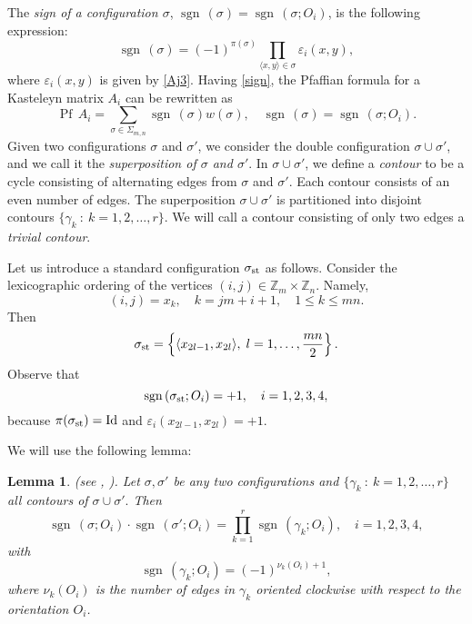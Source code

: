 \documentclass[12pt,reqno]{amsart}
\numberwithin{equation}{section}
\newcommand{\Z}{{\mathbb Z}}
\newcommand{\ga}{\gamma}
\newcommand{\ep}{\varepsilon}
\newcommand{\sg}{\sigma}
\newcommand{\Pf}{{\operatorname{Pf}\,}}
\newcommand{\sgn}{{\operatorname{sgn}\,}}
\newtheorem{lem}[theo]{{\sc \bf Lemma}}
\begin{document}
 The \textit{sign of a configuration $\sg$}, $\sgn(\sg)=\sgn(\sg;O_i)$, is the following expression:
\begin{equation}\label{sign}
\sgn(\sg)=(-1)^{\pi(\sg)}\prod_{\langle x,y\rangle \in\sg}\varepsilon_i(x,y),
\end{equation}
where $\varepsilon_i(x,y)$ is given by \eqref{Aj3}. Having \eqref{sign}, the Pfaffian formula for a Kasteleyn matrix $A_i$ can be rewritten as 
\begin{equation}\label{Pfsign}
\Pf A_i=\sum_{\sg\in\Sigma_{m,n}}\sgn(\sg)w(\sg),\quad  \sgn(\sg)=\sgn(\sg;O_i).
\end{equation}
Given two configurations $\sg$ and $\sg'$, we consider the double configuration $\sg\cup\sg'$, and we call it the \textit{superposition of $\sg$ and $\sg'$}. In $\sg\cup\sg'$, we define a \textit{contour} to be a cycle consisting of alternating edges from $\sg$ and $\sg'$. Each contour consists of an even number of edges. The superposition $\sg\cup\sg'$ is partitioned into disjoint contours $\{\ga_k\ :\ k=1,2,\ldots,r\}$. We will call a contour consisting of only two edges a \textit{trivial contour}. 

Let us introduce a standard configuration $\sg_{\rm st}$ as follows. Consider the lexicographic ordering of the
vertices $(i,j)\in \Z_m\times \Z_n$. Namely,
\begin{equation}\label{lex1}
(i,j)=x_k,\quad  k=jm+i+1, \quad 1\le k\le mn.
\end{equation}
Then
\begin{equation}\label{lex2}
\sg_{\rm st}=\left\{\langle x_{2l-1},x_{2l}\rangle,\; l=1,\ldots,\frac{mn}{2}\right\}.
\end{equation}
Observe that
\begin{equation}\label{lex3}
\sgn(\sg_{\rm st};O _i)=+1,\quad i=1,2,3,4,
\end{equation}
because $\pi(\sg_{\rm st})={\rm Id}$ and $\ep_i( x_{2l-1},x_{2l})=+1$.

We will use the following lemma: 

\begin{lem} (see \cite{Kenyon}, \cite{Tes}). \label{Co}
Let $\sg,\sg'$ be any two configurations and $\{\ga_k\ :\ k=1,2,\ldots,r\}$ all contours of $\sg\cup\sg'.$ Then
\begin{equation}\label{Imp_f}
\sgn(\sg;O_i)\cdot\sgn(\sg';O_i)=\prod_{k=1}^r\sgn(\gamma_k;O_i),\quad i=1,2,3,4,
\end{equation} 
with 
\begin{equation}\label{Imp_fp}
\sgn(\gamma_k;O_i)=(-1)^{\nu_k(O_i)+1},
\end{equation} 
where $\nu_k(O_i)$ is the number of edges in $\gamma_k$ oriented clockwise with respect to the orientation $O_i$. 
\end{lem}
\end{document}
